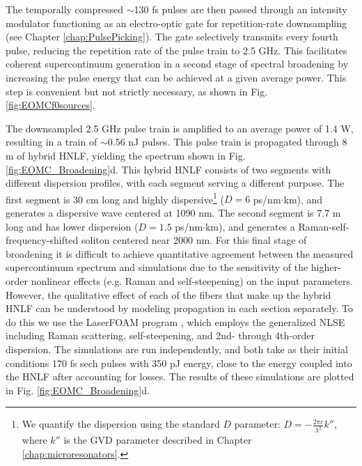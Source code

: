 The temporally compressed $\sim$130 fs pulses are then passed through an intensity modulator functioning as an electro-optic gate for repetition-rate downsampling (see Chapter \ref{chap:PulsePicking}). The gate selectively transmits every fourth pulse, reducing the repetition rate of the pulse train to 2.5 GHz. This facilitates coherent supercontinuum generation in a second stage of spectral broadening by increasing the pulse energy that can be achieved at a given average power. This step is convenient but not strictly necessary, as shown in Fig. \ref{fig:EOMCf0sources}. 

The downsampled 2.5 GHz pulse train is amplified to an average power of 1.4 W, resulting in a train of $\sim$0.56 nJ pulses. This pulse train is propagated through 8 m of hybrid HNLF, yielding the spectrum shown in Fig. \ref{fig:EOMC_Broadening}d. This hybrid HNLF consists of two segments with different dispersion profiles, with each segment serving a different purpose. The first segment is 30 cm long and highly dispersive\footnote{We quantify the dispersion using the standard $D$ parameter: $D=-\frac{2\pi c}{\lambda^2} k''$, where $k''$ is the GVD parameter described in Chapter \ref{chap:microresonators}.} ($D=6$  ps/nm$\cdot$km), and generates a dispersive wave centered at 1090 nm. The second segment is 7.7 m long and has lower dispersion ($D=1.5$  ps/nm$\cdot$km), and generates a Raman-self-frequency-shifted soliton centered near 2000 nm. For this final stage of broadening it is difficult to achieve quantitative agreement between the measured supercontinuum spectrum and simulations due to the sensitivity of the higher-order nonlinear effects (e.g. Raman and self-steepening) on the input parameters. However, the qualitative effect of each of the fibers that make up the hybrid HNLF can be understood by modeling propagation in each section separately. To do this we use the LaserFOAM program \cite{Amorim2009}, which employs the generalized NLSE including Raman scattering, self-steepening, and 2nd- through 4th-order dispersion. The simulations are run independently, and both take as their initial conditions 170 fs sech pulses with 350 pJ energy, close to the energy coupled into the HNLF after accounting for losses. The results of these simulations are plotted in Fig. \ref{fig:EOMC_Broadening}d. 





